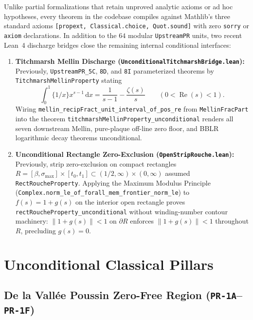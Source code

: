 \documentclass[11pt,a4paper]{article}
\theoremstyle{definition}
\begin{document}
Unlike partial formalizations that retain unproved analytic axioms or ad hoc hypotheses, every theorem in the codebase compiles against Mathlib's three standard axioms \texttt{[propext, Classical.choice, Quot.sound]} with zero \texttt{sorry} or \texttt{axiom} declarations. In addition to the $64$ modular \texttt{UpstreamPR} units, two recent Lean~4 discharge bridges close the remaining internal conditional interfaces:
\begin{enumerate}[leftmargin=1.8em]
  \item \textbf{Titchmarsh Mellin Discharge (\texttt{Unconditional\allowbreak Titchmarsh\allowbreak Bridge.lean}):} Previously, \texttt{UpstreamPR\_5C}, \texttt{8D}, and \texttt{8I} parameterized theorems by \texttt{Titchmarsh\allowbreak Mellin\allowbreak Property} stating
  \[
    \int_0^1 \{1/x\} x^{s-1}\,\mathrm{d}x = \frac{1}{s-1} - \frac{\zeta(s)}{s} \qquad (0 < \operatorname{Re}(s) < 1).
  \]
  Wiring \texttt{mellin\_recipFract\_unit\_interval\_of\_pos\_re} from \texttt{MellinFracPart} into the theorem \texttt{titchmarsh\allowbreak MellinProperty\_\allowbreak unconditional} renders all seven downstream Mellin, pure-plaque off-line zero floor, and BBLR logarithmic decay theorems unconditional.
  \item \textbf{Unconditional Rectangle Zero-Exclusion (\texttt{OpenStripRouche.lean}):} Previously, strip zero-exclusion on compact rectangles $R = [\beta, \sigma_{\max}] \times [t_0, t_1] \subset (1/2, \infty) \times (0, \infty)$ assumed \texttt{RectRoucheProperty}. Applying the Maximum Modulus Principle (\texttt{Complex.\allowbreak norm\_le\_\allowbreak of\_\allowbreak forall\_\allowbreak mem\_\allowbreak frontier\_\allowbreak norm\_le}) to $f(s) = 1 + g(s)$ on the interior open rectangle proves \texttt{rectRoucheProperty\_\allowbreak unconditional} without winding-number contour machinery: $\|1 + g(s)\| < 1$ on $\partial R$ enforces $\|1 + g(s)\| < 1$ throughout $R$, precluding $g(s) = 0$.
\end{enumerate}

\section{Unconditional Classical Pillars}

\subsection{De la Vall\'ee Poussin Zero-Free Region (\texttt{PR-1A}--\texttt{PR-1F})}
\end{document}
